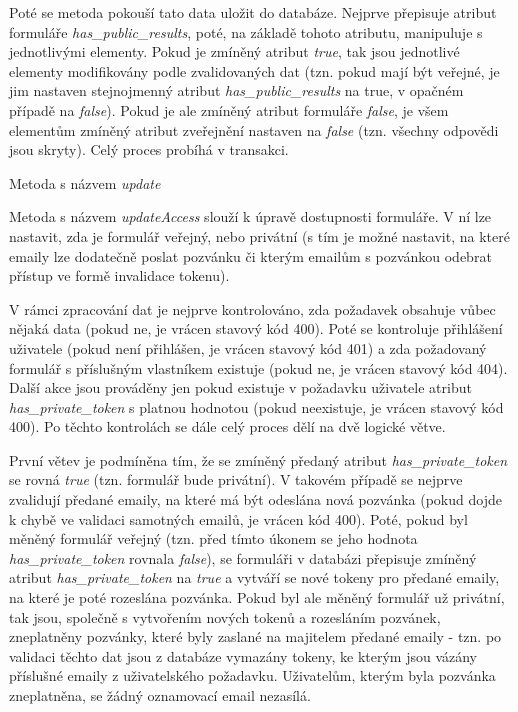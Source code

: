 			Poté se metoda pokouší tato data uložit do databáze. Nejprve přepisuje atribut formuláře \textit{has\_public\_results}, poté, na základě tohoto atributu, manipuluje s jednotlivými elementy. Pokud je zmíněný atribut \textit{true}, tak jsou jednotlivé elementy modifikovány podle zvalidovaných dat (tzn. pokud mají být veřejné, je jim nastaven stejnojmenný atribut \textit{has\_public\_results} na true, v opačném případě na \textit{false}). Pokud je ale zmíněný atribut formuláře \textit{false}, je všem elementům zmíněný atribut zveřejnění nastaven na \textit{false} (tzn. všechny odpovědi jsou skryty). Celý proces probíhá v transakci.
			
			Metoda s názvem \textit{update}
			
			Metoda s názvem \textit{updateAccess} slouží k úpravě dostupnosti formuláře. V ní lze nastavit, zda je formulář veřejný, nebo privátní (s tím je možné nastavit, na které emaily lze dodatečně poslat pozvánku či kterým emailům s pozvánkou odebrat přístup ve formě invalidace tokenu).
			
			V rámci zpracování dat je nejprve kontrolováno, zda požadavek obsahuje vůbec nějaká data (pokud ne, je vrácen stavový kód 400). Poté se kontroluje přihlášení uživatele (pokud není přihlášen, je vrácen stavový kód 401) a zda požadovaný formulář s příslušným vlastníkem existuje (pokud ne, je vrácen stavový kód 404). Další akce jsou prováděny jen pokud existuje v požadavku uživatele atribut \textit{has\_private\_token} s platnou hodnotou (pokud neexistuje, je vrácen stavový kód 400). Po těchto kontrolách se dále celý proces dělí na dvě logické větve. 
			
			První větev je podmíněna tím, že se zmíněný předaný atribut \textit{has\_private\_token} se rovná \textit{true} (tzn. formulář bude privátní). V takovém případě se nejprve zvalidují předané emaily, na které má být odeslána nová pozvánka (pokud dojde k chybě ve validaci samotných emailů, je vrácen kód 400). Poté, pokud byl měněný formulář veřejný (tzn. před tímto úkonem se jeho hodnota \textit{has\_private\_token} rovnala \textit{false}), se formuláři v databázi přepisuje zmíněný atribut \textit{has\_private\_token} na \textit{true} a vytváří se nové tokeny pro předané emaily, na které je poté rozeslána pozvánka. Pokud byl ale měněný formulář už privátní, tak jsou, společně s vytvořením nových tokenů a rozesláním pozvánek, zneplatněny pozvánky, které byly zaslané na majitelem předané emaily - tzn. po validaci těchto dat jsou z databáze vymazány tokeny, ke kterým jsou vázány příslušné emaily z uživatelského požadavku. Uživatelům, kterým byla pozvánka zneplatněna, se žádný oznamovací email nezasílá.
			
